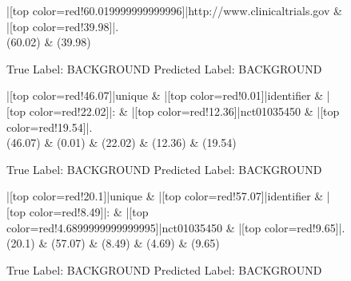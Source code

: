 \documentclass[a4paper, landscape]{article}
\begin{document}
\clearpage
\begin{figure}
\begin{center}
\begin{dependency}
\begin{deptext}
|[top color=red!60.019999999999996]|http://www.clinicaltrials.gov \& |[top color=red!39.98]|.\\
(60.02) \& (39.98)\\
\end{deptext}
\end{dependency}
\end{center}
\caption{True Label: BACKGROUND Predicted Label: BACKGROUND}
\end{figure}
\clearpage
\begin{figure}
\begin{center}
\begin{dependency}
\begin{deptext}
|[top color=red!46.07]|unique \& |[top color=red!0.01]|identifier \& |[top color=red!22.02]|: \& |[top color=red!12.36]|nct01035450 \& |[top color=red!19.54]|.\\
(46.07) \& (0.01) \& (22.02) \& (12.36) \& (19.54)\\
\end{deptext}
\end{dependency}
\end{center}
\caption{True Label: BACKGROUND Predicted Label: BACKGROUND}
\end{figure}
\clearpage
\begin{figure}
\begin{center}
\begin{dependency}
\begin{deptext}
|[top color=red!20.1]|unique \& |[top color=red!57.07]|identifier \& |[top color=red!8.49]|: \& |[top color=red!4.6899999999999995]|nct01035450 \& |[top color=red!9.65]|.\\
(20.1) \& (57.07) \& (8.49) \& (4.69) \& (9.65)\\
\end{deptext}
\end{dependency}
\end{center}
\caption{True Label: BACKGROUND Predicted Label: BACKGROUND}
\end{figure}
\end{document}
